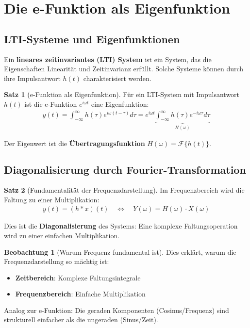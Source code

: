 ﻿\documentclass[a4paper,12pt]{report}
\theoremstyle{definition}
\newtheorem{satz}{Satz}
\newtheorem{beobachtung}{Beobachtung}
\begin{document}
	\section{Die e-Funktion als Eigenfunktion}
	
	\subsection{LTI-Systeme und Eigenfunktionen}
	
	Ein \textbf{lineares zeitinvariantes (LTI) System} ist ein System, das die Eigenschaften Linearität und Zeitinvarianz erfüllt. Solche Systeme können durch ihre Impulsantwort $h(t)$ charakterisiert werden.
	
	\begin{satz}[e-Funktion als Eigenfunktion]
		Für ein LTI-System mit Impulsantwort $h(t)$ ist die e-Funktion $e^{i\omega t}$ eine Eigenfunktion:
		\begin{align}
			y(t) = \int_{-\infty}^{\infty} h(\tau) e^{i\omega(t-\tau)} d\tau = e^{i\omega t} \underbrace{\int_{-\infty}^{\infty} h(\tau) e^{-i\omega\tau} d\tau}_{H(\omega)}
		\end{align}
		
		Der Eigenwert ist die \textbf{Übertragungsfunktion} $H(\omega) = \mathcal{F}\{h(t)\}$.
	\end{satz}
	
	\subsection{Diagonalisierung durch Fourier-Transformation}
	
	\begin{satz}[Fundamentalität der Frequenzdarstellung]
		Im Frequenzbereich wird die Faltung zu einer Multiplikation:
		\begin{align}
			y(t) = (h * x)(t) \quad \Leftrightarrow \quad Y(\omega) = H(\omega) \cdot X(\omega)
		\end{align}
		
		Dies ist die \textbf{Diagonalisierung} des Systems: Eine komplexe Faltungsoperation wird zu einer einfachen Multiplikation.
	\end{satz}
	
	\begin{beobachtung}[Warum Frequenz fundamental ist]
		Dies erklärt, warum die Frequenzdarstellung so mächtig ist:
		\begin{itemize}
			\item[-] \textbf{Zeitbereich}: Komplexe Faltungsintegrale
			\item[-] \textbf{Frequenzbereich}: Einfache Multiplikation
		\end{itemize}
		
		Analog zur e-Funktion: Die geraden Komponenten (Cosinus/Frequenz) sind strukturell einfacher als die ungeraden (Sinus/Zeit).
	\end{beobachtung}
	
\end{document}

